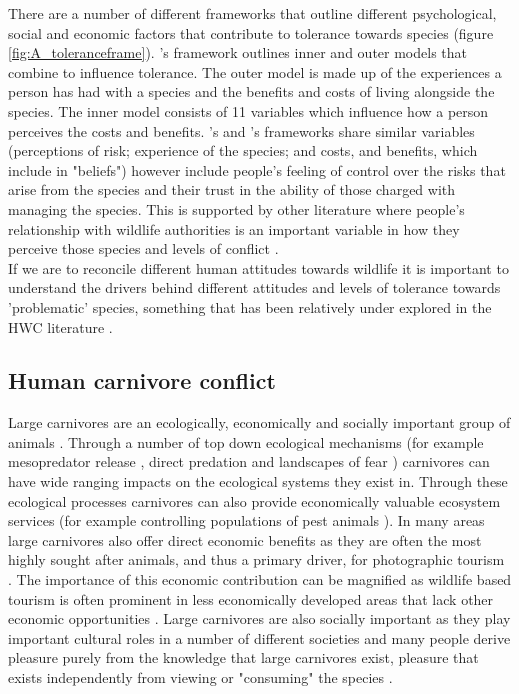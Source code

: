 There are a number of different frameworks that outline different psychological, social and economic factors that contribute to tolerance towards species (figure \ref{fig:A_toleranceframe}). \citet{Kansky2016}'s framework outlines inner and outer models that combine to influence tolerance. The outer model is made up of the experiences a person has had with a species and the benefits and costs of living alongside the species. The inner model consists of 11 variables which influence how a person perceives the costs and benefits. \citet{Bruskotter2014d}'s and \citet{Inskip2016}'s frameworks share similar variables (perceptions of risk; experience of the species; and costs, and benefits, which \citet{Inskip2016} include in "beliefs") however \citet{Bruskotter2014d} include people's feeling of control over the risks that arise from the species and their trust in the ability of those charged with managing the species. This is supported by other literature where people's relationship with wildlife authorities is an important variable in how they perceive those species and levels of conflict \cite{Dickman2010b}.\\

If we are to reconcile different human attitudes towards wildlife it is important to understand the drivers behind different attitudes and levels of tolerance towards 'problematic' species, something that has been relatively under explored in the HWC literature \cite{Dickman2010b}.\\

\subsection{Human carnivore conflict}

Large carnivores are an ecologically, economically and socially important group of animals \cite{Wolf2016,Ripple2014a}. Through a number of top down ecological mechanisms (for example mesopredator release \cite{brashares2010ecological,Crooks1999a,Ripple2013}, direct predation and landscapes of fear \cite{Ripple2004,Schmitz1997}) carnivores can have wide ranging impacts on the ecological systems they exist in. Through these ecological processes carnivores can also provide economically valuable ecosystem services (for example controlling populations of pest animals \cite{brashares2010ecological,Prowse2014,Packer2005}). In many areas large carnivores also offer direct economic benefits as they are often the most highly sought after animals, and thus a primary driver, for photographic tourism \cite{Lindsey2007a,Maciejewski2014}. The importance of this economic contribution can be magnified as wildlife based tourism is often prominent in less economically developed areas that lack other economic opportunities \cite{Ashley2000}. Large carnivores are also socially important as they play important cultural roles in a number of different societies \cite{Hazzah2009a,Shen1982,coggins2003tiger,Kellert1996} and many people derive pleasure purely from the knowledge that large carnivores exist, pleasure that exists independently from viewing or "consuming" the species \cite{Stevens2016}.\\


